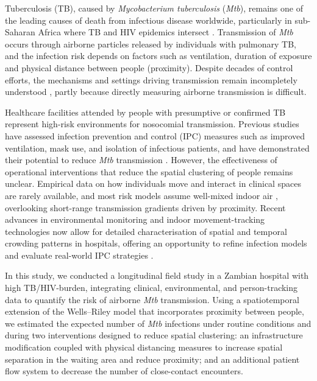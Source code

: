 \documentclass[11pt]{article}
\begin{document}
Tuberculosis (TB), caused by \emph{Mycobacterium tuberculosis} (\emph{Mtb}), remains one of the leading causes of death from infectious disease worldwide, particularly in sub-Saharan Africa where TB and HIV epidemics intersect \cite{worldhealthorganization2024}. Transmission of \emph{Mtb} occurs through airborne particles released by individuals with pulmonary TB, and the infection risk depends on factors such as ventilation, duration of exposure and physical distance between people (proximity). Despite decades of control efforts, the mechanisms and settings driving transmission remain incompletely understood \cite{yates2016LancetInfectDis}, partly because directly measuring airborne transmission is difficult.

Healthcare facilities attended by people with presumptive or confirmed TB represent high-risk environments for nosocomial transmission. Previous studies have assessed infection prevention and control (IPC) measures such as improved ventilation, mask use, and isolation of infectious patients, and have demonstrated their potential to reduce \emph{Mtb} transmission \cite{mccreesh2021BMJGlobHealth,mccreesh2022BMJGlobHealth,dharmadhikari2012AmJRespirCritCareMed,banholzer2025IntJInfectDis,banholzer2025PLOSComputBiol}. However, the effectiveness of operational interventions that reduce the spatial clustering of people remains unclear. Empirical data on how individuals move and interact in clinical spaces are rarely available, and most risk models assume well-mixed indoor air \cite{yates2016LancetInfectDis,riley1978AmJEpidemiol,rudnick2003IndoorAira}, overlooking short-range transmission gradients driven by proximity. Recent advances in environmental monitoring and indoor movement-tracking technologies now allow for detailed characterisation of spatial and temporal crowding patterns in hospitals, offering an opportunity to refine infection models and evaluate real-world IPC strategies \cite{banholzer2025PLOSComputBiol,zurcher2022JInfectDis}.

In this study, we conducted a longitudinal field study in a Zambian hospital with high TB/HIV-burden, integrating clinical, environmental, and person-tracking data to quantify the risk of airborne \emph{Mtb} transmission. Using a spatiotemporal extension of the Wells--Riley model that incorporates proximity between people, we estimated the expected number of \emph{Mtb} infections under routine conditions and during two interventions designed to reduce spatial clustering: an infrastructure modification coupled with physical distancing measures to increase spatial separation in the waiting area and reduce proximity; and an additional patient flow system to decrease the number of close-contact encounters.
\end{document}
